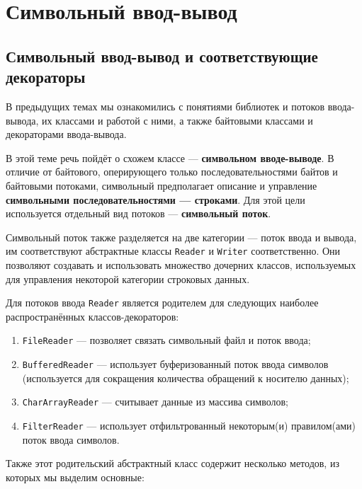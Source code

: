 \newpage
\chapter{Символьный ввод-вывод}

\section{Символьный ввод-вывод и соответствующие декораторы}

В предыдущих темах мы ознакомились с понятиями библиотек и потоков ввода-вывода, их классами и работой с ними, а также байтовыми классами и декораторами ввода-вывода.

В этой теме речь пойдёт о схожем классе — \textbf{символьном вводе-выводе}. В отличие от байтового, оперирующего только последовательностями байтов и байтовыми потоками, символьный предполагает описание и управление \textbf{символьными последовательностями — строками}. Для этой цели используется отдельный вид потоков — \textbf{символьный поток}.

Символьный поток также разделяется на две категории — поток ввода и вывода, им соответствуют абстрактные классы \verb|Reader| и \verb|Writer| соответственно. Они позволяют создавать и использовать множество дочерних классов, используемых для управления некоторой категории строковых данных.

Для потоков ввода \verb|Reader| является родителем для следующих наиболее распространённых классов-декораторов:

\begin{enumerate}
    \item \verb|FileReader| — позволяет связать символьный файл и поток ввода;
    \item \verb|BufferedReader| — использует буферизованный поток ввода символов (используется для сокращения количества обращений к носителю данных);
    \item \verb|CharArrayReader| — считывает данные из массива символов;
    \item \verb|FilterReader| — использует отфильтрованный некоторым(и) правилом(ами) поток ввода символов.
\end{enumerate}

Также этот родительский абстрактный класс содержит несколько методов, из которых мы выделим основные:

